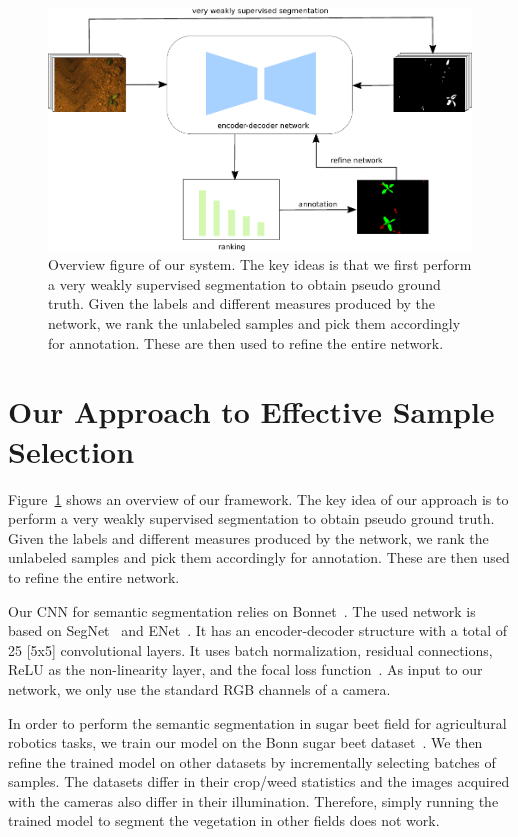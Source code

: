 \documentclass[letterpaper, 10 pt, conference]{ieeeconf}  %
\begin{document}
    \begin{figure}
    \centering
    \includegraphics[width=\linewidth]{pics/output_system_overview.pdf}
      \caption{Overview figure of our system. The key ideas is that we first perform a very weakly supervised segmentation to obtain pseudo ground truth. Given the labels and different measures produced by the network, we rank the unlabeled samples and pick them accordingly for annotation. These are then used to refine the entire network.}
    \label{fig:overview}        
   \end{figure}


\section{Our Approach to Effective Sample Selection}
\label{sec:approach}

Figure~\ref{fig:overview} shows an overview of our framework.
The key idea of our approach is to perform a very weakly supervised segmentation to obtain pseudo ground truth. Given the labels and different measures produced by the network, we rank the unlabeled samples and pick them accordingly for annotation. These are then used to refine the entire network.


Our CNN for semantic segmentation relies on Bonnet~\cite{milioto2018bonnet}.
The used network is based on SegNet~\cite{badrinarayanan2017segnet} and ENet~\cite{paszke2016enet}. It has an encoder-decoder structure with a total of 25 [5x5] convolutional layers. It uses batch normalization, residual connections, ReLU as the non-linearity layer, and the focal loss function~\cite{DBLP:conf/iccv/LinGGHD17}.
As input to our network, we only use the standard RGB channels of a camera.

In order to perform the semantic segmentation in sugar beet field for agricultural robotics tasks,
we train our model on the Bonn sugar beet dataset~\cite{chebrolu2017agricultural}. We then refine the trained model on other datasets by incrementally selecting batches of samples. The datasets differ in their crop/weed statistics and the images acquired with the cameras also differ in their illumination. Therefore, simply running the trained model to segment the vegetation in other fields does not work.
\end{document}
